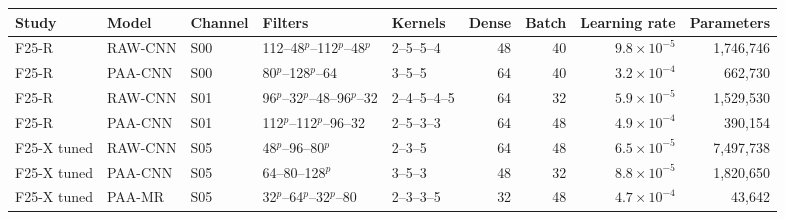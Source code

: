 \begin{tabular}{lllllrrrr}
\toprule
Study & Model & Channel & Filters & Kernels & Dense & Batch & Learning rate & Parameters \\
\midrule
F25-R & RAW-CNN & S00 & 112--48$^{p}$--112$^{p}$--48$^{p}$ & 2--5--5--4 & 48 & 40 & $9.8\times10^{-5}$ & 1,746,746 \\
F25-R & PAA-CNN & S00 & 80$^{p}$--128$^{p}$--64 & 3--5--5 & 64 & 40 & $3.2\times10^{-4}$ & 662,730 \\
F25-R & RAW-CNN & S01 & 96$^{p}$--32$^{p}$--48--96$^{p}$--32 & 2--4--5--4--5 & 64 & 32 & $5.9\times10^{-5}$ & 1,529,530 \\
F25-R & PAA-CNN & S01 & 112$^{p}$--112$^{p}$--96--32 & 2--5--3--3 & 64 & 48 & $4.9\times10^{-4}$ & 390,154 \\
F25-X tuned & RAW-CNN & S05 & 48$^{p}$--96--80$^{p}$ & 2--3--5 & 64 & 48 & $6.5\times10^{-5}$ & 7,497,738 \\
F25-X tuned & PAA-CNN & S05 & 64--80--128$^{p}$ & 3--5--3 & 48 & 32 & $8.8\times10^{-5}$ & 1,820,650 \\
F25-X tuned & PAA-MR & S05 & 32$^{p}$--64$^{p}$--32$^{p}$--80 & 2--3--3--5 & 32 & 48 & $4.7\times10^{-4}$ & 43,642 \\
\bottomrule
\end{tabular}
